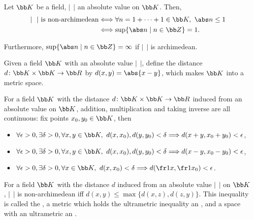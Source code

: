 
Let $\bb K$ be a field, $|\ \ |$ an absolute value on $\bb K$. Then,
\begin{align*}
|\ \ |\ \text{is non-archimedean} &\Longleftrightarrow \forall n = 1 + \dotsb + 1 \in \bb K,\ \abs n \le 1 \\
&\Longleftrightarrow \sup \{ \abs n \mid n \in \bb Z \} = 1.
\end{align*}

Furthermore, $\sup \{ \abs n \mid n \in \bb Z \} = \infty$ if $|\ \ |$ is archimedean.　

Given a field $\bb K$ with an absolute value $|\ \ |$, define the distance $d \colon \bb K \times \bb K \to \bb R$ by $d(x,y) = \abs{x-y}$, which makes $\bb K$ into a metric space.

For a field $\bb K$ with the distance $d \colon \bb K \times \bb K \to \bb R$ induced from an absolute value on $\bb K$, addition, multiplication and taking inverse are all continuous: fix points $x_0, y_0 \in \bb K$, then
\begin{itemize}
  \item $\forall \epsilon > 0, \exists \delta > 0, \forall x, y \in \bb K,\ d(x, x_0), d(y, y_0) < \delta \Longrightarrow d(x+y, x_0 + y_0) < \epsilon$,
  \item $\forall \epsilon > 0, \exists \delta > 0, \forall x, y \in \bb K,\ d(x, x_0), d(y, y_0) < \delta \Longrightarrow d(x-y, x_0 - y_0) < \epsilon$,
  \item $\forall \epsilon > 0, \exists \delta > 0, \forall x \in \bb K,\ d(x, x_0) < \delta \Longrightarrow d(\fr1x, \fr1{x_0}) < \epsilon$.
\end{itemize}

For a field $\bb K$ with the distance $d$ induced from an absolute value $|\ \ |$ on $\bb K$, $|\ \ |$ is non-archimedean iff $d(x,y) \le \max\{ d(x,z), d(z,y)\}$. This inequality is called the , a metric which holds the ultrametric inequality an , and a space with an ultrametric an .

